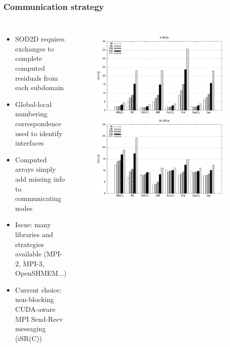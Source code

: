 \begin{frame}
	\frametitle{Communication strategy}
	\begin{columns}
		\begin{itemize}
			\item SOD2D requires exchanges to complete computed residuals from each subdomain
			\item Global-local numbering correspondence used to identify interfaces
			\item Computed arrays simply add missing info to communicating nodes
			\item Issue: many libraries and strategies available (MPI-2, MPI-3, OpenSHMEM...)
			\item Current choice: non-blocking CUDA-aware MPI Send-Recv messaging (iSR(C))
		\end{itemize}
		\begin{figure}
			\centering
			\includegraphics[width=0.95\textwidth]{images/mpiCompar/4gpuAll.png}
			\includegraphics[width=0.95\textwidth]{images/mpiCompar/32gpuAll.png}
		\end{figure}
	\end{columns}
\end{frame}

